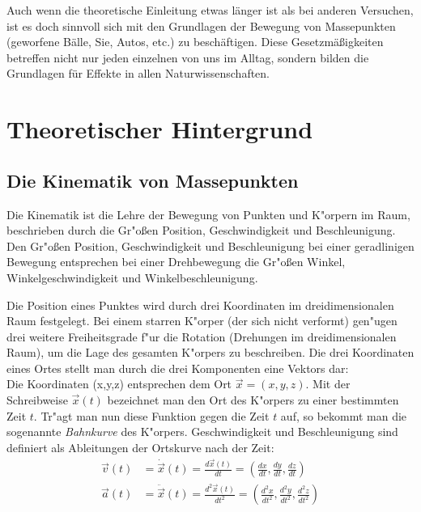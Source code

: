 Auch wenn die theoretische Einleitung etwas länger ist als bei anderen Versuchen, ist es doch sinnvoll sich mit den Grundlagen der Bewegung von Massepunkten (geworfene Bälle, Sie, Autos, etc.) zu beschäftigen. Diese Gesetzmäßigkeiten betreffen nicht nur jeden einzelnen von uns im Alltag, sondern bilden die Grundlagen für Effekte in allen Naturwissenschaften.
%
\section{Theoretischer Hintergrund}

\subsection{Die Kinematik von Massepunkten}

Die Kinematik ist die Lehre der Bewegung von Punkten und K"orpern im Raum, beschrieben durch die Gr"o{\ss}en Position, Geschwindigkeit und Beschleunigung.\\
Den Gr"o{\ss}en Position, Geschwindigkeit und Beschleunigung bei einer geradlinigen Bewegung entsprechen bei einer Drehbewegung die Gr"o{\ss}en Winkel, Winkelgeschwindigkeit und Winkelbeschleunigung.

Die Position eines Punktes wird durch drei Koordinaten im dreidimensionalen Raum festgelegt. Bei einem starren K"orper (der sich nicht verformt) gen"ugen drei weitere Freiheitsgrade f"ur die Rotation (Drehungen im dreidimensionalen Raum), um die Lage des gesamten K"orpers zu beschreiben. Die drei Koordinaten eines Ortes stellt man durch die drei Komponenten eine Vektors dar:\\
Die Koordinaten (x,y,z) entsprechen dem Ort $\vec{x} = (x,y,z)$. Mit der Schreibweise $\vec{x}(t)$ bezeichnet man den Ort des K"orpers zu einer bestimmten Zeit $t$. Tr"agt man nun diese Funktion gegen die Zeit $t$ auf, so bekommt man die sogenannte \textit{Bahnkurve} des K"orpers. Geschwindigkeit und Beschleunigung sind definiert als Ableitungen der Ortskurve nach der Zeit:
\begin{align}
\vec{v}(t) & = \dot{\vec{x}}(t) = \frac{d\vec{x}(t)}{dt} = \left(\frac{dx}{dt}, \frac{dy}{dt}, \frac{dz}{dt}\right) \\
\vec{a}(t) & = \ddot{\vec{x}}(t) = \frac{d^2\vec{x}(t)}{dt^2} = \left(\frac{d^2x}{dt^2} , \frac{d^2y}{dt^2}, \frac{d^2z}{dt^2}\right)
\end{align}

